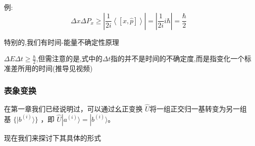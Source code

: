\documentclass[lang=cn,10pt]{elegantbook}
\begin{document}
例:
\begin{equation*}
	\varDelta x\varDelta P_x\ge |\frac{1}{2i}\left< \left[ x,\hat{p} \right] \right> |=|\frac{1}{2i}i\hbar |=\frac{\hbar}{2}
\end{equation*}

特别的,我们有时间-能量不确定性原理

$\varDelta E\varDelta t\ge \frac{\hbar}{2}$,但需注意的是,式中的$\varDelta t$指的并不是时间的不确定度,而是指变化一个标准差所用的时间(推导见视频)
	\subsubsection{表象变换}
	在第一章我们已经说明过，可以通过幺正变换 $\hat{U}$将一组正交归一基转变为另一组基 $\{ |b^{(i)}\rangle \}$ ，即 $\hat{U}|a^{(i)}\rangle =  |b^{(i)}\rangle$。

现在我们来探讨下其具体的形式
\end{document}
